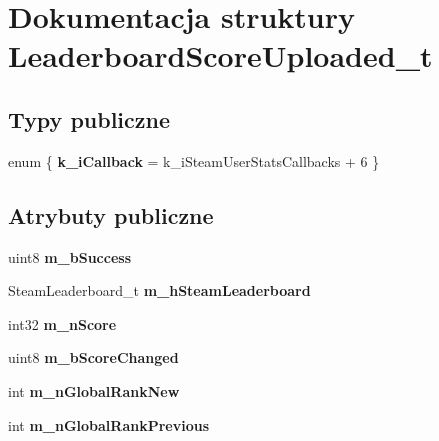 \hypertarget{struct_leaderboard_score_uploaded__t}{}\section{Dokumentacja struktury Leaderboard\+Score\+Uploaded\+\_\+t}
\label{struct_leaderboard_score_uploaded__t}
\subsection*{Typy publiczne}
\begin{DoxyCompactItemize}
\item 
\mbox{\label{struct_leaderboard_score_uploaded__t_a608554c5fc3298440c3032cb24655ac4}} 
enum \{ {\bfseries k\+\_\+i\+Callback} = k\+\_\+i\+Steam\+User\+Stats\+Callbacks + 6
 \}
\end{DoxyCompactItemize}
\subsection*{Atrybuty publiczne}
\begin{DoxyCompactItemize}
\item 
\mbox{\label{struct_leaderboard_score_uploaded__t_a3766dbe8dd8d8025675b33f0d6f7d97c}} 
uint8 {\bfseries m\+\_\+b\+Success}
\item 
\mbox{\label{struct_leaderboard_score_uploaded__t_a4900e93dc306e7ccf68252759e64a976}} 
Steam\+Leaderboard\+\_\+t {\bfseries m\+\_\+h\+Steam\+Leaderboard}
\item 
\mbox{\label{struct_leaderboard_score_uploaded__t_a04da5bc31f53bb33c7efc6d97ec2dfbb}} 
int32 {\bfseries m\+\_\+n\+Score}
\item 
\mbox{\label{struct_leaderboard_score_uploaded__t_ac556d96384ddba95731ad75820004e86}} 
uint8 {\bfseries m\+\_\+b\+Score\+Changed}
\item 
\mbox{\label{struct_leaderboard_score_uploaded__t_a8008b7178416abd3d3ad7498d4f0f8a0}} 
int {\bfseries m\+\_\+n\+Global\+Rank\+New}
\item 
\mbox{\label{struct_leaderboard_score_uploaded__t_a617a71e4f8a50d910a21db0a4612f5ad}} 
int {\bfseries m\+\_\+n\+Global\+Rank\+Previous}
\end{DoxyCompactItemize}


